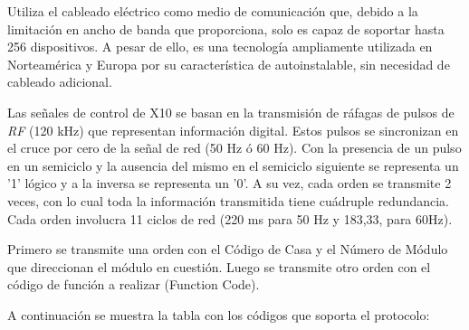 
Utiliza el cableado eléctrico como medio de comunicación que, debido a la limitación en ancho de banda que proporciona, solo es capaz de soportar hasta 256 dispositivos. A pesar de ello, es una tecnología ampliamente utilizada en Norteamérica y Europa por su característica de autoinstalable, sin necesidad de cableado adicional.

Las señales de control de X10 se basan en la transmisión de ráfagas de pulsos de \emph{RF} (120 kHz) que representan información digital. Estos pulsos se sincronizan en el cruce por cero de la señal de red (50 Hz ó 60 Hz). Con la presencia de un pulso en un semiciclo y la ausencia del mismo en el semiciclo siguiente se representa un '1' lógico y a la inversa se representa un '0'. A su vez, cada orden se transmite 2 veces, con lo cual toda la información transmitida tiene cuádruple redundancia. Cada orden involucra 11 ciclos de red (220 ms para 50 Hz y 183,33, para 60Hz).

Primero se transmite una orden con el Código de Casa y el Número de Módulo que direccionan el módulo en cuestión. Luego se transmite otro orden con el código de función a realizar (Function Code).

A continuación se muestra la tabla con los códigos que soporta el protocolo:

